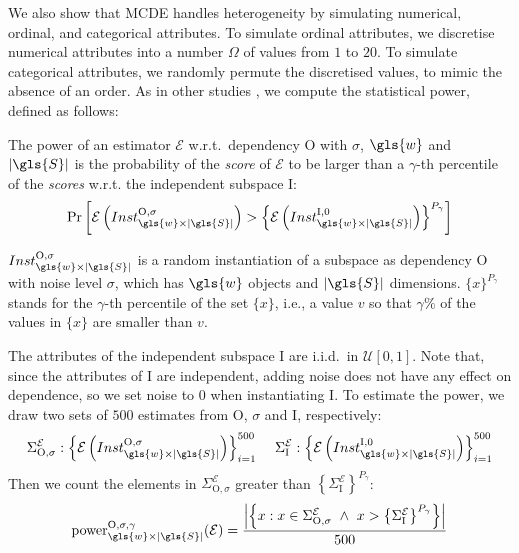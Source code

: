 We also show that \gls{MCDE} handles heterogeneity by simulating numerical, ordinal, and categorical attributes. To simulate ordinal attributes, we discretise numerical attributes into a number $\Omega$ of values from $1$ to $20$. To simulate categorical attributes, we randomly permute the discretised values, to mimic the absence of an order. As in other studies \cite{DBLP:conf/sdm/NguyenMV16, Reshef1518, Kinney2013}, we compute the statistical power, defined as follows: 

\begin{definition}[Power]
	The power of an estimator $\mathcal{E}$ w.r.t.\ dependency O with $\sigma$, $\gls{w}$ and $|\gls{S}|$ is the probability of the \textit{score} of $\mathcal{E}$ to be larger than a $\gamma$-th percentile of the \textit{scores} w.r.t. the independent subspace \textup{I}:
	\begin{align*}
	\Pr\left[ \mathcal{E}\left(Inst_{\gls{w} \times |\gls{S}|}^{\textup{O},\sigma}\right) > \left \{\mathcal{E}\left(Inst_{\gls{w} \times  |\gls{S}|}^{\textup{I},0}\right) \right \}^{P_\gamma} \right]
	\end{align*} 
\end{definition}

$Inst_{\gls{w} \times |\gls{S}|}^{\text{O},\sigma}$ is a random instantiation of a subspace as dependency O with noise level $\sigma$, which has $\gls{w}$ objects and $|\gls{S}|$ dimensions. $\{x\}^{P_\gamma}$ stands for the $\gamma$-th percentile of the set $\{x\}$, i.e., a value $v$ so that $\gamma \%$ of the values in $\{x\}$ are smaller than $v$.

The attributes of the independent subspace I are i.i.d.\ in $\mathcal{U}[0,1]$. Note that, since the attributes of I are independent, adding noise does not have any effect on dependence, so we set noise to 0 when instantiating I. 
To estimate the power, we draw two sets of $500$ estimates from $\text{O}$, $\sigma$ and $\text{I}$, respectively: 
\begin{align*}
\Sigma^\mathcal{E}_{\text{O}, \sigma} : \left \{ \mathcal{E}\left(Inst_{\gls{w} \times |\gls{S}|}^{\text{O},\sigma}\right) \right \}_{i=1}^{500} ~ &&\Sigma^{\mathcal{E}}_\text{I} : \left \{ \mathcal{E}\left(Inst_{\gls{w} \times |\gls{S}|}^{\text{I},0}\right) \right \}_{i=1}^{500}
\end{align*}
Then we count the elements in $\Sigma^\mathcal{E}_{\text{O}, \sigma}$ greater than $\left \{\Sigma^{\mathcal{E}}_\text{I} \right \}^{P_\gamma}$: 
\begin{align*}
\text{power}^{\text{O},\sigma,\gamma}_{\gls{w} \times |\gls{S}|}(\mathcal{E})  = \frac{\left|\left\{x:x \in \Sigma^\mathcal{E}_{\text{O}, \sigma} ~\wedge~  x > \left \{\Sigma^{\mathcal{E}}_\text{I} \right \}^{P_\gamma}\right \}\right|}{500}
\end{align*}

